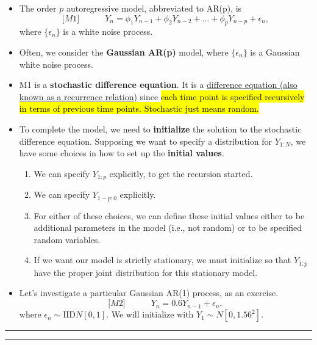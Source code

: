 \documentclass[]{article}
\begin{document}
\begin{itemize}
\item
  The order \(p\) autoregressive model, abbreviated to AR(p), is
  $${[}M1{]}
  \quad\quad \quad Y_n = \phi_1 Y_{n-1}+\phi_2Y_{n-2}+\dots+\phi_pY_{n-p} + \epsilon_n,$$
  where \(\{\epsilon_n\}\) is a white noise process.
\item
  Often, we consider the \textbf{Gaussian AR(p)} model, where
  \(\{\epsilon_n\}\) is a Gaussian white noise process.
\item
  M1 is a \textbf{stochastic difference equation}. It is a
  \href{https://en.wikipedia.org/wiki/Recurrence_relation}{difference
  equation (also known as a recurrence relation)} since \hl{each time point
  is specified recursively in terms of previous time points. Stochastic
  just means random.}
\item
  To complete the model, we need to \textbf{initialize} the solution to
  the stochastic difference equation. Supposing we want to specify a
  distribution for \(Y_{1:N}\), we have some choices in how to set up
  the \textbf{initial values}.

  \begin{enumerate}
  \def\labelenumi{\arabic{enumi}.}
  \item
    We can specify \(Y_{1:p}\) explicitly, to get the recursion started.
  \item
    We can specify \(Y_{1-p:0}\) explicitly.
  \item
    For either of these choices, we can define these initial values
    either to be additional parameters in the model (i.e., not random)
    or to be specified random variables.
  \item
    If we want our model is strictly stationary, we must initialize so
    that \(Y_{1:p}\) have the proper joint distribution for this
    stationary model.
  \end{enumerate}
\item
  Let's investigate a particular Gaussian AR(1) process, as an exercise.
  $${[}M2{]} \quad\quad \quad Y_n = 0.6 Y_{n-1}+ \epsilon_n,$$ where
  \(\epsilon_n\sim \mathrm{IID} N[0,1]\). We will initialize with
  \(Y_1\sim N[0,1.56^2]\).
\end{itemize}

\begin{center}\rule{0.5\linewidth}{\linethickness}\end{center}

\begin{center}\rule{0.5\linewidth}{\linethickness}\end{center}
\end{document}
